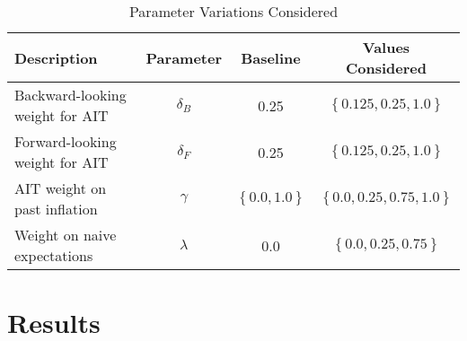 \documentclass[english,authoryear,12pt]{elsarticle}
\begin{document}
\begin{table}\caption{Parameter Variations Considered}\label{tb:parmsvary}
	\begin{center}
		\begin{tabular}{lccc}
			Description & Parameter & Baseline & Values Considered \\ \hline
			Backward-looking weight for AIT & $\delta_B$ & 0.25 & $\left\{0.125, 0.25, 1.0 \right\}$ \\  [0.25pc]
			Forward-looking weight for AIT & $\delta_F$ & 0.25 & $\left\{0.125, 0.25, 1.0 \right\}$ \\  [0.25pc]
			AIT weight on past inflation & $\gamma$ & $\left\{ 0.0, 1.0 \right\}$ & $\left\{ 0.0, 0.25, 0.75, 1.0\right\}$ \\  [0.25pc]
			Weight on naive expectations & $\lambda$ & 0.0 & $\left\{ 0.0, 0.25, 0.75 \right\}$ \\ [0.25pc]
			\hline
		\end{tabular}
	\end{center}
\end{table}

\section{Results}





\end{document}
